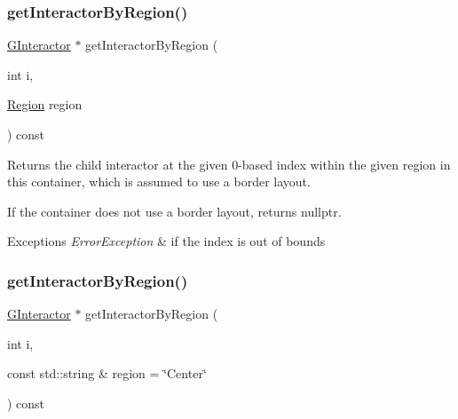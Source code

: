 \subsubsection{\texorpdfstring{get\+Interactor\+By\+Region()}{getInteractorByRegion()}\hspace{0.1cm}{\footnotesize\ttfamily [1/2]}}
{\footnotesize\ttfamily \mbox{\hyperlink{classsgl_1_1GInteractor}{G\+Interactor}} $\ast$ get\+Interactor\+By\+Region (\begin{DoxyParamCaption}\item[{int}]{i,  }\item[{\mbox{\hyperlink{classsgl_1_1GContainer_a81a01a86de31071a92e6cce0bab9bc4b}{Region}}}]{region }\end{DoxyParamCaption}) const\hspace{0.3cm}{\ttfamily [virtual]}}



Returns the child interactor at the given 0-\/based index within the given region in this container, which is assumed to use a border layout. 

If the container does not use a border layout, returns nullptr. 
\begin{DoxyExceptions}{Exceptions}
{\em Error\+Exception} & if the index is out of bounds \\
\hline
\end{DoxyExceptions}
\mbox{\label{classsgl_1_1GContainer_a576bbbb845c9bcf139fca956e3a4c757}} 
\subsubsection{\texorpdfstring{get\+Interactor\+By\+Region()}{getInteractorByRegion()}\hspace{0.1cm}{\footnotesize\ttfamily [2/2]}}
{\footnotesize\ttfamily \mbox{\hyperlink{classsgl_1_1GInteractor}{G\+Interactor}} $\ast$ get\+Interactor\+By\+Region (\begin{DoxyParamCaption}\item[{int}]{i,  }\item[{const std\+::string \&}]{region = {\ttfamily \char`\"{}Center\char`\"{}} }\end{DoxyParamCaption}) const\hspace{0.3cm}{\ttfamily [virtual]}}



